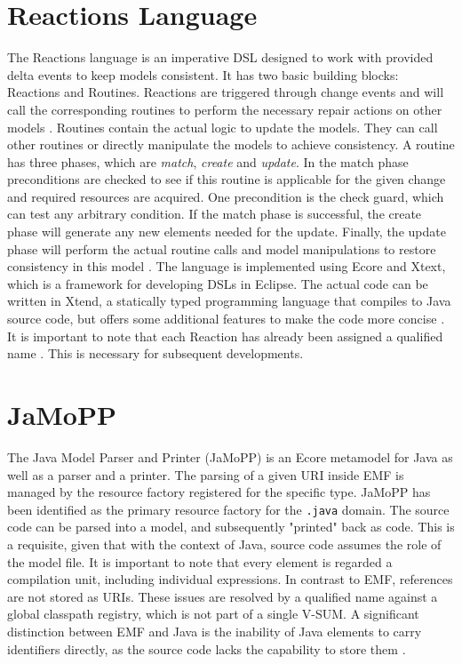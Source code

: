 \section{Reactions Language}
\label{sec:Foundations:ReactionsLanguage}

The Reactions language is an imperative DSL designed to work with provided delta events to keep models consistent.
It has two basic building blocks: Reactions and Routines.
Reactions are triggered through change events and will call the corresponding routines to perform the necessary repair actions on other models \cite{KLARE2021110815}.
Routines contain the actual logic to update the models.
They can call other routines or directly manipulate the models to achieve consistency.
A routine has three phases, which are \textit{match}, \textit{create} and \textit{update}.
In the match phase preconditions are checked to see if this routine is applicable for the given change and required resources are acquired.
One precondition is the check guard, which can test any arbitrary condition.
If the match phase is successful, the create phase will generate any new elements needed for the update.
Finally, the update phase will perform the actual routine calls and model manipulations to restore consistency in this model \cite{reactionsDocumentation}.
The language is implemented using Ecore and Xtext, which is a framework for developing DSLs in Eclipse.
The actual code can be written in Xtend, a statically typed programming language that compiles to Java source code, but offers some additional features to make the code more concise \cite{xtext,xtend}.
It is important to note that each Reaction has already been assigned a qualified name \cite{reactionsDocumentation}.
This is necessary for subsequent developments.

\section{JaMoPP}
\label{sec:Foundations:JaMoPP}

The Java Model Parser and Printer (JaMoPP) is an Ecore metamodel for Java as well as a parser and a printer.
The parsing of a given URI inside EMF is managed by the resource factory registered for the specific type.
JaMoPP has been identified as the primary resource factory for the \texttt{.java} domain.
The source code can be parsed into a model, and subsequently "printed" back as code.
This is a requisite, given that with the context of Java, source code assumes the role of the model file.
It is important to note that every element is regarded a compilation unit, including individual expressions.
In contrast to EMF, references are not stored as URIs.
These issues are resolved by a qualified name against a global classpath registry, which is not part of a single V-SUM.
A significant distinction between EMF and Java is the inability of Java elements to carry identifiers directly, as the source code lacks the capability to store them \cite{heidenreich2009closing}.

